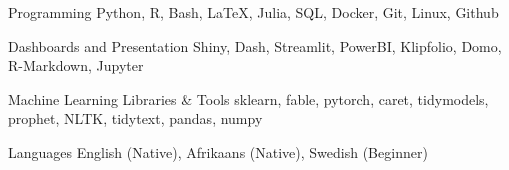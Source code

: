 

\begin{cvskills}

  \cvskill
    {Programming} %
    {Python, R, Bash, \LaTeX, Julia, SQL, Docker, Git, Linux, Github} %

  \cvskill
    {Dashboards and Presentation} %
    {Shiny, Dash, Streamlit, PowerBI, Klipfolio, Domo, R-Markdown, Jupyter} %

  \cvskill
    {Machine Learning Libraries \& Tools} %
    {sklearn, fable, pytorch, caret, tidymodels, prophet, NLTK, tidytext, pandas, numpy} %

  \cvskill
    {Languages} %
        {English (Native), Afrikaans (Native), Swedish (Beginner)} %

\end{cvskills}
